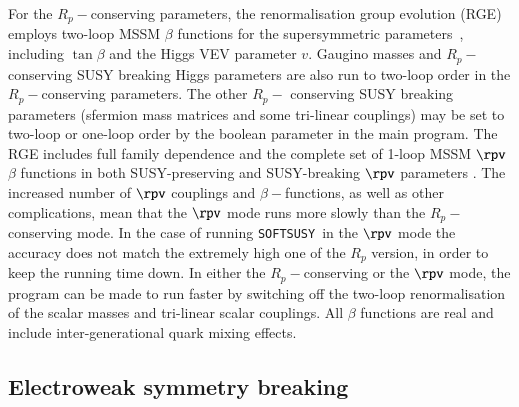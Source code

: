 \documentclass[final,3p,times,pdflatex]{elsarticle}
\def\SOFTSUSY{{\tt SOFTSUSY}}
\begin{document}
For the $R_p-$conserving
parameters, the renormalisation group evolution (RGE) employs two-loop MSSM
$\beta$ 
functions for the supersymmetric 
parameters~\cite{Barger:1993gh}, including $\tan \beta$ and the Higgs
VEV parameter $v$. 
Gaugino masses and $R_p-$conserving SUSY breaking Higgs parameters are also
run to two-loop order in the $R_p-$conserving parameters. The other $R_p-$
conserving SUSY breaking parameters (sfermion mass matrices and some
tri-linear couplings) may be set to two-loop or one-loop order by the boolean
parameter  in the main program.
The RGE includes
full family dependence and the complete set of 1-loop MSSM $\rpv$ $\beta$
functions in both SUSY-preserving and SUSY-breaking $\rpv$ 
parameters \cite{Allanach:2003eb}. 
The increased number
of $\rpv$ couplings and $\beta-$functions, as well as other complications,
mean that the $\rpv$ mode runs more slowly than the $R_p-$conserving mode. 
In the case of running \SOFTSUSY~in the $\rpv$ mode
the accuracy does not match the extremely high one of the $R_p$
version, in order to keep the running time down. 
 In either the $R_p-$conserving or the $\rpv$ mode, the program 
can be made to run faster by switching off the two-loop renormalisation of 
the scalar masses and tri-linear scalar couplings. All
$\beta$ functions are real and include inter-generational quark mixing
effects. 

\subsection{Electroweak symmetry breaking \label{ewsb}}
\end{document}
